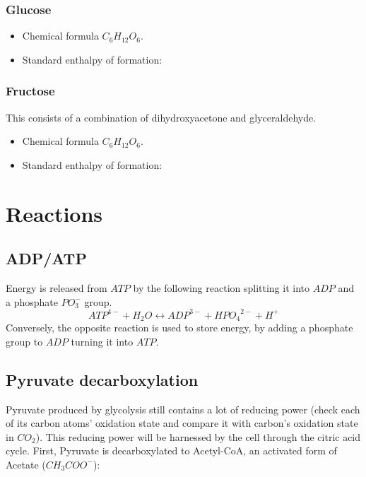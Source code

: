 \documentclass{article}
\begin{document}
\subsubsection{Glucose}
\begin{itemize}
    \item Chemical formula $C_6H_{12}O_6$.
    \item Standard enthalpy of formation:
\end{itemize}

\subsubsection{Fructose}
This consists of a combination of dihydroxyacetone and glyceraldehyde.

\begin{itemize}
    \item Chemical formula $C_6H_{12}O_6$.
    \item Standard enthalpy of formation:
\end{itemize}



\pagebreak
\section{Reactions}\label{sec_reactions}

\subsection{ADP/ATP}
Energy is released from $\mathit{ATP}$ by the following reaction splitting it into $ADP$ and a
phosphate $PO_3^-$ group.
\[
    {ATP}^{4-} + H_2O \leftrightarrow {ADP}^{3-} + {HPO_4}^{2-} + H^+
\]
Conversely, the opposite reaction is used to store energy, by adding a phosphate group to
$ADP$ turning it into $\mathit{ATP}$.

\subsection{Pyruvate decarboxylation}
Pyruvate produced by glycolysis still contains a lot of reducing power (check each of its
carbon atoms' oxidation state and compare it with carbon's oxidation state in $CO_2$). This
reducing power will be harnessed by the cell through the citric acid cycle. First,
Pyruvate is decarboxylated to Acetyl-CoA, an activated form of Acetate ($CH_3COO^-$):
\end{document}
